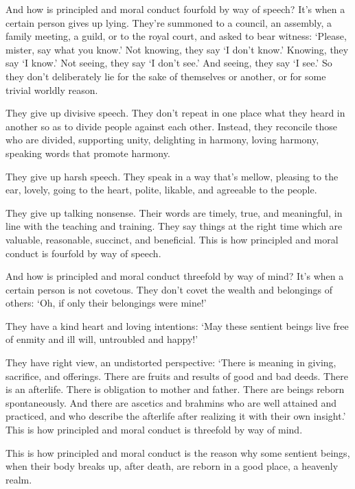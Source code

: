 \documentclass[12pt,openany]{book}%
\begin{document}
And how is principled and moral conduct fourfold by way of speech? It’s when a certain person gives up lying. They’re summoned to a council, an assembly, a family meeting, a guild, or to the royal court, and asked to bear witness: ‘Please, mister, say what you know.’ Not knowing, they say ‘I don’t know.’ Knowing, they say ‘I know.’ Not seeing, they say ‘I don’t see.’ And seeing, they say ‘I see.’ So they don’t deliberately lie for the sake of themselves or another, or for some trivial worldly reason. 

They give up divisive speech. They don’t repeat in one place what they heard in another so as to divide people against each other. Instead, they reconcile those who are divided, supporting unity, delighting in harmony, loving harmony, speaking words that promote harmony. 

They give up harsh speech. They speak in a way that’s mellow, pleasing to the ear, lovely, going to the heart, polite, likable, and agreeable to the people. 

They give up talking nonsense. Their words are timely, true, and meaningful, in line with the teaching and training. They say things at the right time which are valuable, reasonable, succinct, and beneficial. This is how principled and moral conduct is fourfold by way of speech. 

And how is principled and moral conduct threefold by way of mind? It's when a certain person is not covetous. They don’t covet the wealth and belongings of others: ‘Oh, if only their belongings were mine!’ 

They have a kind heart and loving intentions: ‘May these sentient beings live free of enmity and ill will, untroubled and happy!’ 

They have right view, an undistorted perspective: ‘There is meaning in giving, sacrifice, and offerings. There are fruits and results of good and bad deeds. There is an afterlife. There is obligation to mother and father. There are beings reborn spontaneously. And there are ascetics and brahmins who are well attained and practiced, and who describe the afterlife after realizing it with their own insight.’ This is how principled and moral conduct is threefold by way of mind. 

This is how principled and moral conduct is the reason why some sentient beings, when their body breaks up, after death, are reborn in a good place, a heavenly realm. 
\end{document}
